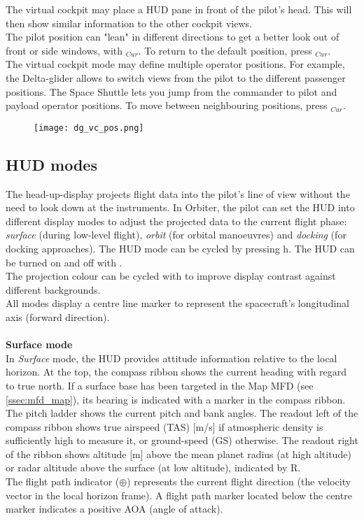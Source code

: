 \documentclass[Orbiter User Manual.tex]{subfiles}
\begin{document}
\noindent
The virtual cockpit may place a HUD pane in front of the pilot's head. This will then show similar information to the other cockpit views.\\
The pilot position can "lean" in different directions to get a better look out of front or side windows, with \Ctrl\Alt\UArrow\RArrow\LArrow$_{Cur}$. To return to the default position, press \Ctrl\Alt\DArrow$_{Cur}$.\\
The virtual cockpit mode may define multiple operator positions. For example, the Delta-glider allows to switch views from the pilot to the different passenger positions. The Space Shuttle lets you jump from the commander to pilot and payload operator positions. To move between neighbouring positions, press \Ctrl\UArrow\DArrow\RArrow\LArrow$_{Cur}$.

\begin{figure}[H]
  \centering
  \texttt{[image: dg\_vc\_pos.png]}
\end{figure}


\subsection{HUD modes}
\label{ssec:hud_modes}
The head-up-display projects flight data into the pilot's line of view without the need to look down at the instruments. In Orbiter, the pilot can set the HUD into different display modes to adjust the projected data to the current flight phase: \textit{surface} (during low-level flight), \textit{orbit} (for orbital manoeuvres) and \textit{docking} (for docking approaches). The HUD mode can be cycled by pressing h. The HUD can be turned on and off with \Ctrl{}.\\
The projection colour can be cycled with \Alt{} to improve display contrast against different backgrounds.\\
All modes display a centre line marker to represent the spacecraft's longitudinal axis (forward direction).\\
\\
\textbf{Surface mode}\\
In \textit{Surface} mode, the HUD provides attitude information relative to the local horizon. At the top, the compass ribbon shows the current heading with regard to true north. If a surface base has been targeted in the Map MFD (see \ref{ssec:mfd_map}), its bearing is indicated with a marker in the compass ribbon. The pitch ladder shows the current pitch and bank angles. The readout left of the compass ribbon shows true airspeed (TAS) [m/s] if atmospheric density is sufficiently high to measure it, or ground-speed (GS) otherwise. The readout right of the ribbon shows altitude [m] above the mean planet radius (at high altitude) or radar altitude above the surface (at low altitude), indicated by R.\\
The flight path indicator ($\oplus$) represents the current flight direction (the velocity vector in the local horizon frame). A flight path marker located below the centre marker indicates a positive AOA (angle of attack).
\end{document}
